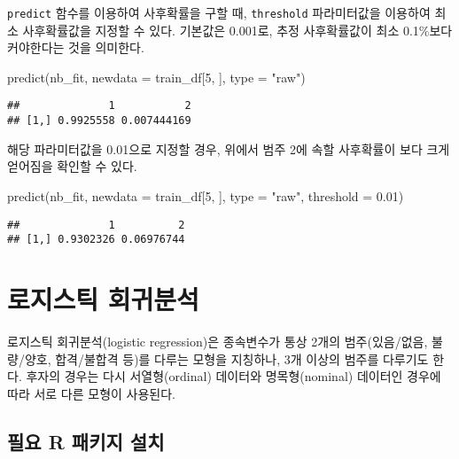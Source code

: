 \documentclass[
]{book}
\newenvironment{Shaded}{\begin{snugshade}}{\end{snugshade}}
\newcommand{\AttributeTok}[1]{\textcolor[rgb]{0.77,0.63,0.00}{#1}}
\newcommand{\DecValTok}[1]{\textcolor[rgb]{0.00,0.00,0.81}{#1}}
\newcommand{\FloatTok}[1]{\textcolor[rgb]{0.00,0.00,0.81}{#1}}
\newcommand{\FunctionTok}[1]{\textcolor[rgb]{0.00,0.00,0.00}{#1}}
\newcommand{\NormalTok}[1]{#1}
\newcommand{\StringTok}[1]{\textcolor[rgb]{0.31,0.60,0.02}{#1}}
\begin{document}
\texttt{predict} 함수를 이용하여 사후확률을 구할 때, \texttt{threshold} 파라미터값을 이용하여 최소 사후확률값을 지정할 수 있다. 기본값은 0.001로, 추정 사후확률값이 최소 0.1\%보다 커야한다는 것을 의미한다.

\begin{Shaded}
\begin{Highlighting}[]
\FunctionTok{predict}\NormalTok{(nb\_fit, }\AttributeTok{newdata =}\NormalTok{ train\_df[}\DecValTok{5}\NormalTok{, ], }\AttributeTok{type =} \StringTok{"raw"}\NormalTok{)}
\end{Highlighting}
\end{Shaded}

\begin{verbatim}
##              1           2
## [1,] 0.9925558 0.007444169
\end{verbatim}

해당 파라미터값을 0.01으로 지정할 경우, 위에서 범주 2에 속할 사후확률이 보다 크게 얻어짐을 확인할 수 있다.

\begin{Shaded}
\begin{Highlighting}[]
\FunctionTok{predict}\NormalTok{(nb\_fit, }\AttributeTok{newdata =}\NormalTok{ train\_df[}\DecValTok{5}\NormalTok{, ], }\AttributeTok{type =} \StringTok{"raw"}\NormalTok{, }\AttributeTok{threshold =} \FloatTok{0.01}\NormalTok{)}
\end{Highlighting}
\end{Shaded}

\begin{verbatim}
##              1          2
## [1,] 0.9302326 0.06976744
\end{verbatim}

\hypertarget{logistic-regression}{%
\chapter{로지스틱 회귀분석}\label{logistic-regression}}

로지스틱 회귀분석(logistic regression)은 종속변수가 통상 2개의 범주(있음/없음, 불량/양호, 합격/불합격 등)를 다루는 모형을 지칭하나, 3개 이상의 범주를 다루기도 한다. 후자의 경우는 다시 서열형(ordinal) 데이터와 명목형(nominal) 데이터인 경우에 따라 서로 다른 모형이 사용된다.

\hypertarget{logistic-packages-install}{%
\section{필요 R 패키지 설치}\label{logistic-packages-install}}
\end{document}
